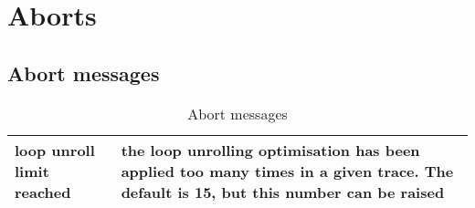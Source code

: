 \section{Aborts}

\subsection{Abort messages}

\begin{table}[H]
\centering
\begin{tabular}{|p{5cm}|p{8cm}|}
\hline
loop unroll limit reached & the loop unrolling  optimisation has been applied too many times in a given trace. The default is 15, but this number can be raised\\
\hline

\end{tabular}
\caption{Abort messages}
\label{tab:abort-messages}
\end{table}





\newpage